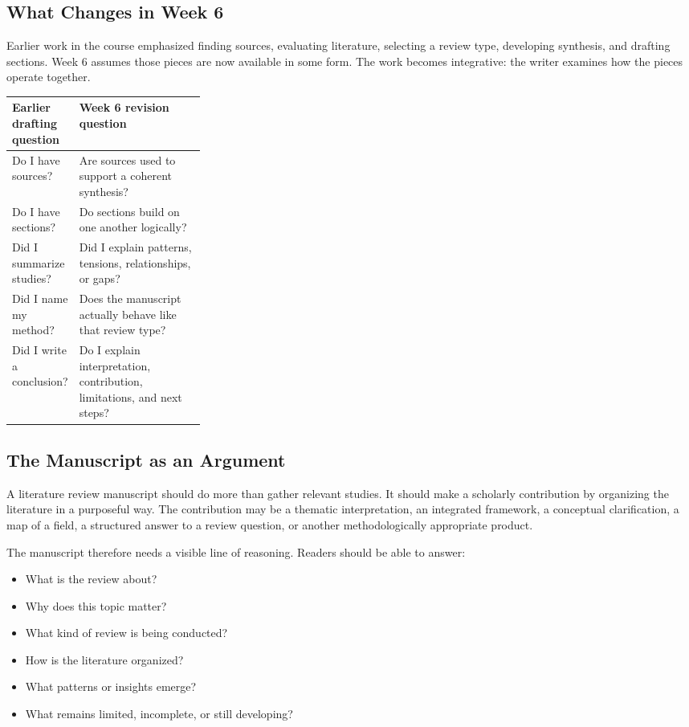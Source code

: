 \documentclass[11pt]{article}
\begin{document}
\subsection{What Changes in Week 6}

Earlier work in the course emphasized finding sources, evaluating literature, selecting a review type, developing synthesis, and drafting sections. Week 6 assumes those pieces are now available in some form. The work becomes integrative: the writer examines how the pieces operate together.

\begin{center}
\begin{tabularx}{0.95\linewidth}{>{\raggedright\arraybackslash}p{0.28\linewidth}Y}
\toprule
\textbf{Earlier drafting question} & \textbf{Week 6 revision question} \\
\midrule
Do I have sources? & Are sources used to support a coherent synthesis? \\
Do I have sections? & Do sections build on one another logically? \\
Did I summarize studies? & Did I explain patterns, tensions, relationships, or gaps? \\
Did I name my method? & Does the manuscript actually behave like that review type? \\
Did I write a conclusion? & Do I explain interpretation, contribution, limitations, and next steps? \\
\bottomrule
\end{tabularx}
\end{center}

\subsection{The Manuscript as an Argument}

A literature review manuscript should do more than gather relevant studies. It should make a scholarly contribution by organizing the literature in a purposeful way. The contribution may be a thematic interpretation, an integrated framework, a conceptual clarification, a map of a field, a structured answer to a review question, or another methodologically appropriate product.

The manuscript therefore needs a visible line of reasoning. Readers should be able to answer:

\begin{itemize}
  \item What is the review about?
  \item Why does this topic matter?
  \item What kind of review is being conducted?
  \item How is the literature organized?
  \item What patterns or insights emerge?
  \item What remains limited, incomplete, or still developing?
\end{itemize}
\end{document}

